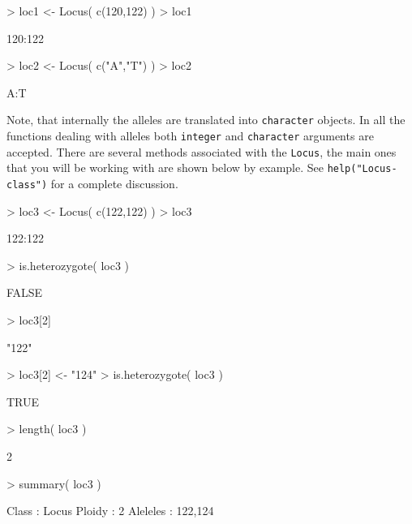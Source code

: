 \documentclass[letterpaper,twoside,openany]{book}
\begin{document}
\begin{Schunk}
\begin{Sinput}
> loc1 <- Locus( c(120,122) )
> loc1
\end{Sinput}
\begin{Soutput}
120:122 
\end{Soutput}
\begin{Sinput}
> loc2 <- Locus( c("A","T") )
> loc2
\end{Sinput}
\begin{Soutput}
A:T 
\end{Soutput}
\end{Schunk}

Note, that internally the alleles are translated into \texttt{character} objects.  In all the functions dealing with alleles both \texttt{integer} and \texttt{character} arguments are accepted.  There are several methods associated with the \texttt{Locus}, the main ones that you will be working with are shown below by example.  See \texttt{help("Locus-class")} for a complete discussion.


\begin{Schunk}
\begin{Sinput}
> loc3 <- Locus( c(122,122) )
> loc3
\end{Sinput}
\begin{Soutput}
122:122 
\end{Soutput}
\begin{Sinput}
> is.heterozygote( loc3 )
\end{Sinput}
\begin{Soutput}
[1] FALSE
\end{Soutput}
\begin{Sinput}
> loc3[2]
\end{Sinput}
\begin{Soutput}
[1] "122"
\end{Soutput}
\begin{Sinput}
> loc3[2] <- "124"
> is.heterozygote( loc3 )
\end{Sinput}
\begin{Soutput}
[1] TRUE
\end{Soutput}
\begin{Sinput}
> length( loc3 )
\end{Sinput}
\begin{Soutput}
[1] 2
\end{Soutput}
\begin{Sinput}
> summary( loc3 )
\end{Sinput}
\begin{Soutput}
Class : Locus 
Ploidy : 2 
Aleleles : 122,124 
\end{Soutput}
\end{Schunk}
\end{document}
